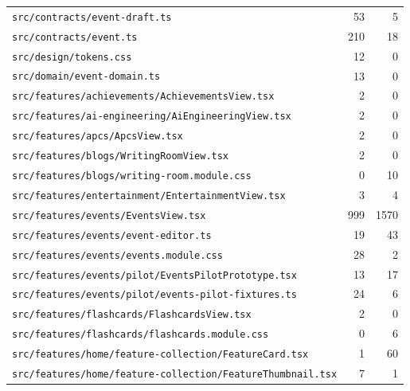 \begin{longtable}{p{}rr}
\texttt{src/\allowbreak{}contracts/\allowbreak{}event-draft.ts} & 53 & 5 \\
\texttt{src/\allowbreak{}contracts/\allowbreak{}event.ts} & 210 & 18 \\
\texttt{src/\allowbreak{}design/\allowbreak{}tokens.css} & 12 & 0 \\
\texttt{src/\allowbreak{}domain/\allowbreak{}event-domain.ts} & 13 & 0 \\
\texttt{src/\allowbreak{}features/\allowbreak{}achievements/\allowbreak{}AchievementsView.tsx} & 2 & 0 \\
\texttt{src/\allowbreak{}features/\allowbreak{}ai-engineering/\allowbreak{}AiEngineeringView.tsx} & 2 & 0 \\
\texttt{src/\allowbreak{}features/\allowbreak{}apcs/\allowbreak{}ApcsView.tsx} & 2 & 0 \\
\texttt{src/\allowbreak{}features/\allowbreak{}blogs/\allowbreak{}WritingRoomView.tsx} & 2 & 0 \\
\texttt{src/\allowbreak{}features/\allowbreak{}blogs/\allowbreak{}writing-room.module.css} & 0 & 10 \\
\texttt{src/\allowbreak{}features/\allowbreak{}entertainment/\allowbreak{}EntertainmentView.tsx} & 3 & 4 \\
\texttt{src/\allowbreak{}features/\allowbreak{}events/\allowbreak{}EventsView.tsx} & 999 & 1570 \\
\texttt{src/\allowbreak{}features/\allowbreak{}events/\allowbreak{}event-editor.ts} & 19 & 43 \\
\texttt{src/\allowbreak{}features/\allowbreak{}events/\allowbreak{}events.module.css} & 28 & 2 \\
\texttt{src/\allowbreak{}features/\allowbreak{}events/\allowbreak{}pilot/\allowbreak{}EventsPilotPrototype.tsx} & 13 & 17 \\
\texttt{src/\allowbreak{}features/\allowbreak{}events/\allowbreak{}pilot/\allowbreak{}events-pilot-fixtures.ts} & 24 & 6 \\
\texttt{src/\allowbreak{}features/\allowbreak{}flashcards/\allowbreak{}FlashcardsView.tsx} & 2 & 0 \\
\texttt{src/\allowbreak{}features/\allowbreak{}flashcards/\allowbreak{}flashcards.module.css} & 0 & 6 \\
\texttt{src/\allowbreak{}features/\allowbreak{}home/\allowbreak{}feature-collection/\allowbreak{}FeatureCard.tsx} & 1 & 60 \\
\texttt{src/\allowbreak{}features/\allowbreak{}home/\allowbreak{}feature-collection/\allowbreak{}FeatureThumbnail.tsx} & 7 & 1 \\

\end{longtable}
